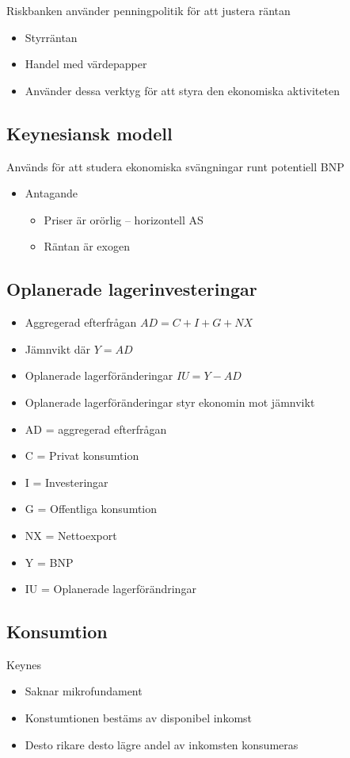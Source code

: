 \documentclass[12pt,a4paper]{article}
\begin{document}
\noindent Riskbanken använder penningpolitik för att justera räntan
\begin{itemize}
    \item Styrräntan 
    \item Handel med värdepapper
    \item Använder dessa verktyg för att styra den ekonomiska aktiviteten
\end{itemize}

\subsection{Keynesiansk modell}
Används för att studera ekonomiska svängningar runt potentiell BNP
\begin{itemize}
    \item Antagande
    \begin{itemize}
        \item Priser är orörlig -- horizontell AS
        \item Räntan är exogen 
    \end{itemize}
\end{itemize}

\subsection{Oplanerade lagerinvesteringar}
\begin{itemize}
    \item Aggregerad efterfrågan $AD = C + I + G + NX$
    \item Jämnvikt där $Y = AD$
    \item Oplanerade lagerföränderingar $IU = Y - AD$
    \item Oplanerade lagerföränderingar styr ekonomin mot jämnvikt
    \item AD = aggregerad efterfrågan
    \item C = Privat konsumtion
    \item I = Investeringar
    \item G = Offentliga konsumtion
    \item NX = Nettoexport
    \item Y = BNP
    \item IU = Oplanerade lagerförändringar
\end{itemize}

\subsection{Konsumtion}
Keynes
\begin{itemize}
    \item Saknar mikrofundament
    \item Konstumtionen bestäms av disponibel inkomst
    \item Desto rikare desto lägre andel av inkomsten konsumeras
\end{itemize}
\end{document}
